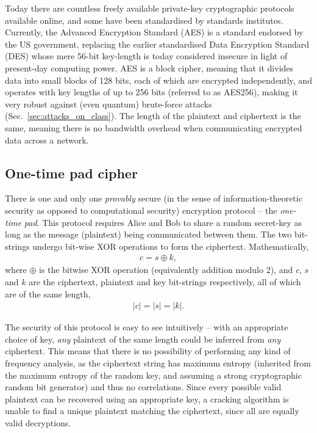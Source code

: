 Today there are countless freely available private-key cryptographic protocols available online, and some have been standardised by standards institutes. Currently, the Advanced Encryption Standard (AES) is a standard endorsed by the US government, replacing the earlier standardised Data Encryption Standard (DES) whose mere 56-bit key-length is today considered insecure in light of present-day computing power. AES is a block cipher, meaning that it divides data into small blocks of 128 bits, each of which are encrypted independently, and operates with key lengths of up to 256 bits (referred to as AES256), making it very robust against (even quantum) brute-force attacks (Sec.~\ref{sec:attacks_on_class}). The length of the plaintext and ciphertext is the same, meaning there is no bandwidth overhead when communicating encrypted data across a network.

%
%

\subsection{One-time pad cipher}

There is one and only one \textit{provably} secure (in the sense of information-theoretic security as opposed to computational security) encryption protocol -- the \textit{one-time pad}. This protocol requires Alice and Bob to share a random secret-key as long as the message (plaintext) being communicated between them. The two bit-strings undergo bit-wise XOR operations to form the ciphertext. Mathematically,
\begin{align}
c = s \oplus k,
\end{align}
where $\oplus$ is the bitwise XOR operation (equivalently addition modulo 2), and $c$, $s$ and $k$ are the ciphertext, plaintext and key bit-strings respectively, all of which are of the same length,
\begin{align}
	|c|=|s|=|k|.
\end{align}

The security of this protocol is easy to see intuitively -- with an appropriate choice of key, \textit{any} plaintext of the same length could be inferred from \textit{any} ciphertext. This means that there is no possibility of performing any kind of frequency analysis, as the ciphertext string has maximum entropy (inherited from the maximum entropy of the random key, and assuming a strong cryptographic random bit generator) and thus no correlations. Since every possible valid plaintext can be recovered using an appropriate key, a cracking algorithm is unable to find a unique plaintext matching the ciphertext, since all are equally valid decryptions.

